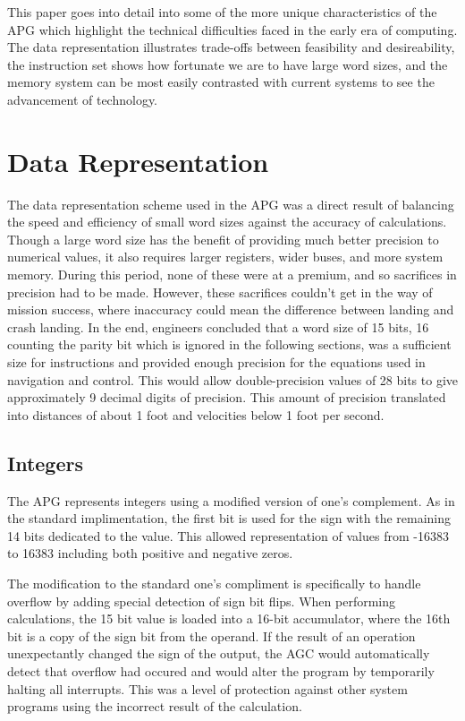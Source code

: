 \documentclass[a4paper,11pt]{article}
\begin{document}
This paper goes into detail into some of the more unique characteristics of the APG which highlight the technical difficulties faced in the early era of computing.  The data representation illustrates trade-offs between feasibility and desireability, the instruction set shows how fortunate we are to have large word sizes, and the memory system can be most easily contrasted with current systems to see the advancement of technology.  


\section{Data Representation}
The data representation scheme used in the APG was a direct result of balancing the speed and efficiency of small word sizes against the accuracy of calculations.  Though a large word size has the benefit of providing much better precision to numerical values, it also requires larger registers, wider buses, and more system memory.  During this period, none of these were at a premium, and so sacrifices in precision had to be made.  However, these sacrifices couldn't get in the way of mission success, where inaccuracy could mean the difference between landing and crash landing.  In the end, engineers concluded that a word size of 15 bits, 16 counting the parity bit which is ignored in the following sections, was a sufficient size for instructions and provided enough precision for the equations used in navigation and control. This would allow double-precision values of 28 bits to give approximately 9 decimal digits of precision.  This amount of precision translated into distances of about 1 foot and velocities below 1 foot per second.  

\subsection{Integers}
The APG represents integers using a modified version of one's complement. As in the standard implimentation, the first bit is used for the sign with the remaining 14 bits dedicated to the value.  This allowed representation of values from -16383 to 16383 including both positive and negative zeros. 

The modification to the standard one's compliment is specifically to handle overflow by adding special detection of sign bit flips.  When performing calculations, the 15 bit value is loaded into a 16-bit accumulator, where the 16th bit is a copy of the sign bit from the operand.  If the result of an operation unexpectantly changed the sign of the output, the AGC would automatically detect that overflow had occured and would alter the program by temporarily halting all interrupts.  This was a level of protection against other system programs using the incorrect result of the calculation.
\end{document}
